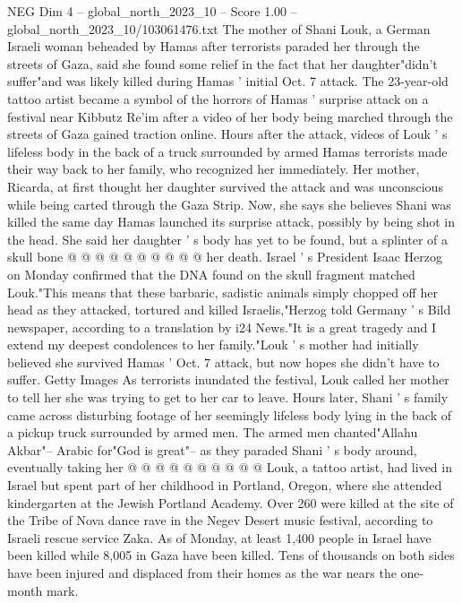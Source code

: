 \begin{textsample}{NEG Dim 4 – global\_north\_2023\_10 – Score 1.00 – global\_north\_2023\_10/103061476.txt}  \label{ex:f4_neg_015}
The mother of Shani Louk, a German Israeli woman beheaded by Hamas after terrorists paraded her through the streets of Gaza, said she found some relief in the fact that her daughter"didn't suffer"and was likely killed during Hamas ' initial Oct. 7 attack.
The 23-year-old tattoo artist became a symbol of the horrors of Hamas ' surprise attack on a festival near Kibbutz Re'im after a video of her body being marched through the streets of Gaza gained traction online.
Hours after the attack, videos of Louk ' s lifeless body in the back of a truck surrounded by armed Hamas terrorists made their way back to her family, who recognized her immediately.
Her mother, Ricarda, at first thought her daughter survived the attack and was unconscious while being carted through the Gaza Strip.
Now, she says she believes Shani was killed the same day Hamas launched its surprise attack, possibly by being shot in the head.
She said her daughter ' s body has yet to be found, but a splinter of a skull bone @ @ @ @ @ @ @ @ @ @ her death.
Israel ' s President Isaac Herzog on Monday confirmed that the DNA found on the skull fragment matched Louk."This means that these barbaric, sadistic animals simply chopped off her head as they attacked, tortured and killed Israelis,"Herzog told Germany ' s Bild newspaper, according to a translation by i24 News."It is a great tragedy and I extend my deepest condolences to her family."Louk ' s mother had initially believed she survived Hamas ' Oct. 7 attack, but now hopes she didn't have to suffer.
Getty Images As terrorists inundated the festival, Louk called her mother to tell her she was trying to get to her car to leave.
Hours later, Shani ' s family came across disturbing footage of her seemingly lifeless body lying in the back of a pickup truck surrounded by armed men.
The armed men chanted"Allahu Akbar"-- Arabic for"God is great"-- as they paraded Shani ' s body around, eventually taking her @ @ @ @ @ @ @ @ @ @ Louk, a tattoo artist, had lived in Israel but spent part of her childhood in Portland, Oregon, where she attended kindergarten at the Jewish Portland Academy.
Over 260 were killed at the site of the Tribe of Nova dance rave in the Negev Desert music festival, according to Israeli rescue service Zaka.
As of Monday, at least 1,400 people in Israel have been killed while 8,005 in Gaza have been killed.
Tens of thousands on both sides have been injured and displaced from their homes as the war nears the one-month mark.

\end{textsample}
